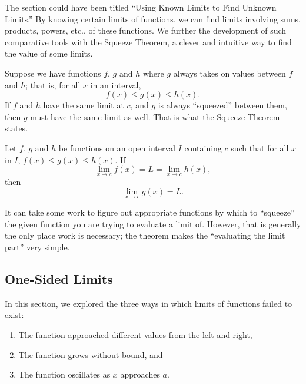 
The section could have been titled ``Using Known Limits to Find Unknown Limits.'' By knowing certain limits of functions, we can find limits involving sums, products, powers, etc., of these functions. We further the development of such comparative tools with the Squeeze Theorem, a clever and intuitive way to find the value of some limits. 

Suppose we have functions $f$, $g$ and $h$ where $g$ always takes on values between $f$ and $h$; that is, for all $x$ in an interval, 
\[ f(x) \leq g(x) \leq h(x). \] 
If $f$ and $h$ have the same limit at $c$, and $g$  is always ``squeezed'' between them, then $g$ must have the same limit as well. That is what the Squeeze Theorem states.

{Let $f$, $g$ and $h$ be functions on an open interval $I$ containing $c$ such that for all $x$ in $I$, $f(x)\leq g(x) \leq h(x)$. If 
\[ \lim_{x\to c} f(x) = L = \lim_{x\to c} h(x),\] 
then 
\[ \lim_{x\to c} g(x) = L.\] 
} %

It can take some work to figure out appropriate functions by which to ``squeeze'' the given function you are trying to evaluate a limit of. However, that is generally the only place work is necessary; the theorem makes the ``evaluating the limit part'' very simple. %



\subsection*{One-Sided Limits}

In this section, we explored the three ways in which limits of functions failed to exist: 
\begin{enumerate}[1)]
\item The function approached different values from the left and right,
\item The function grows without bound, and 
\item The function oscillates as $x$ approaches $a$.
\end{enumerate}
	

